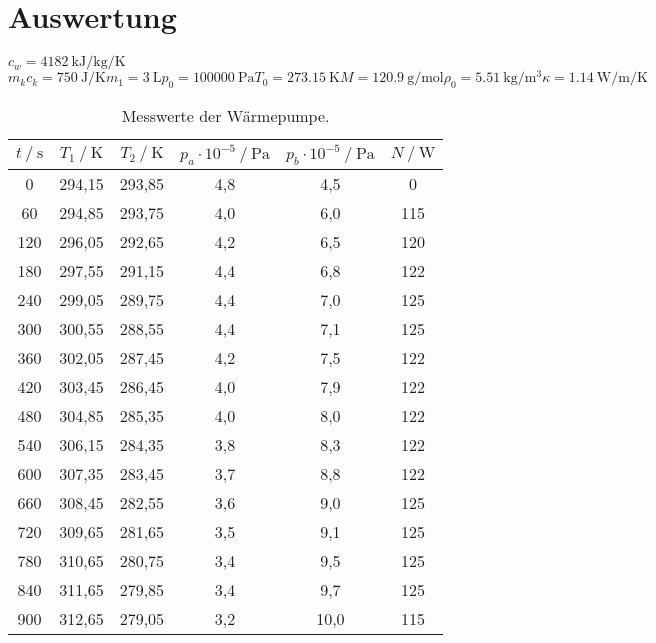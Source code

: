 \section{Auswertung}
\label{sec:Auswertung}

$c_w = \qty{4182}{\kilo\joule\per\kilo\gram\per\kelvin}$ \cite[381]{PhyPrak}
$m_kc_k=\qty{750}{\joule\per\kelvin}
m_1= \qty{3}{\liter}
p_0= \qty{100000}{\pascal}
T_0= \qty{273.15}{\kelvin}
M= \qty{120.9}{\gram\per\mol}
\rho_0= \qty{5.51}{\kilo\gram\per\cubic\meter}
\kappa=\qty{1.14}{\watt\per\meter\per\kelvin}$

\begin{table}[H]
	\centering
	\caption{Messwerte der Wärmepumpe.}
	\label{tab:Tab1}
	\begin{tabular}{S[table-format=4.0] S S S[table-format=1.1] S[table-format=2.1] S[table-format=3.0]}
		\toprule
      {$t \mathbin{/} \si{\second}$}&{$T_1 \mathbin{/} \si{\kelvin}$}&{$T_2 \mathbin{/} \si{\kelvin}$}&{$p_a \cdot 10^{-5} \mathbin{/} \si{\pascal}$}&{$p_b \cdot 10^{-5} \mathbin{/} \si{\pascal}$} &
      {$N \mathbin{/} \si{\watt}$}\\
     & 294,15 & 293,85 & 4,8 & 4,5 & 0\\
      60 & 294,85 & 293,75 & 4,0 & 6,0 & 115\\
      120 & 296,05 & 292,65 & 4,2 & 6,5 & 120\\
      180 & 297,55 & 291,15 & 4,4 & 6,8 & 122\\
      240 & 299,05 & 289,75 & 4,4 & 7,0 & 125\\
      300 & 300,55 & 288,55 & 4,4 & 7,1 & 125\\
      360 & 302,05 & 287,45 & 4,2 & 7,5 & 122\\
      420 & 303,45 & 286,45 & 4,0 & 7,9 & 122\\
      480 & 304,85 & 285,35 & 4,0 & 8,0 & 122\\
      540 & 306,15 & 284,35 & 3,8 & 8,3 & 122\\
      600 & 307,35 & 283,45 & 3,7 & 8,8 & 122\\
      660 & 308,45 & 282,55 & 3,6 & 9,0 & 125\\
      720 & 309,65 & 281,65 & 3,5 & 9,1 & 125\\
      780 & 310,65 & 280,75 & 3,4 & 9,5 & 125\\
      840 & 311,65 & 279,85 & 3,4 & 9,7 & 125\\
      900 & 312,65 & 279,05 & 3,2 & 10,0 & 115\\

\end{tabular}
\end{table}
